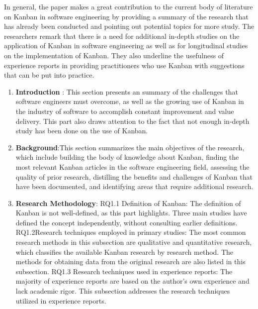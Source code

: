 \documentclass[conference]{IEEEtran}
\begin{document}
In general, the paper makes a great contribution to the current body of literature on Kanban in software engineering by providing a summary of the research that has already been conducted and pointing out potential topics for more study. The researchers remark that there is a need for additional in-depth studies on the application of Kanban in software engineering as well as for longitudinal studies on the implementation of Kanban. They also underline the usefulness of experience reports in providing practitioners who use Kanban with suggestions that can be put into practice.
\begin{enumerate}
    \item \textbf{Introduction} : This section presents an summary of the challenges that software engineers must overcome, as well as the growing use of Kanban in the industry of software to accomplish constant improvement and value delivery. This part also draws attention to the fact that not enough in-depth study has been done on the use of Kanban.


\item \textbf{Background}:This section summarizes the main objectives of the research, which include building the body of knowledge about Kanban, finding the most relevant Kanban articles in the software engineering field, assessing the quality of prior research, distilling the benefits and challenges of Kanban that have been documented, and identifying areas that require additional research.


\item \textbf{Research Methodology}: RQ1.1 Definition of Kanban: The definition of Kanban is not well-defined, as this part highlights. Three main studies have defined the concept independently, without consulting earlier definitions.
\newline
RQ1.2Research techniques employed in primary studies: The most common research methods in this subsection are qualitative and quantitative research, which classifies the available Kanban research by research method. The methods for obtaining data from the original research are also listed in this subsection.
\newline
RQ1.3 Research techniques used in experience reports: The majority of experience reports are based on the author's own experience and lack academic rigor. This subsection addresses the research techniques utilized in experience reports.


\end{enumerate}
\end{document}
